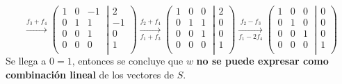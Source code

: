 \documentclass[a4paper,12pt]{article}
\begin{document}
$$
\xrightarrow[]{f_3+f_4}
\left ( \left.\begin{matrix}
1 & 0 & -1 \ \\  
0 & 1 & 1 \ \\ 
0 & 0 & 1 \ \\ 
0 & 0 & 0 \ \\
\end{matrix}\right| \begin{matrix}
2 \\ 
-1\\ 
0 \\
1 \\ 
\end{matrix}\right )
\xrightarrow[f_1+f_3]{f_2+f_4}
\left ( \left.\begin{matrix}
1 & 0 & 0 \ \\  
0 & 1 & 1 \ \\ 
0 & 0 & 1 \ \\ 
0 & 0 & 0 \ \\
\end{matrix}\right| \begin{matrix}
2 \\ 
0 \\ 
0 \\
1 \\ 
\end{matrix}\right )
\xrightarrow[f_1-2f_4]{f_2-f_3}
\left ( \left.\begin{matrix}
1 & 0 & 0 \ \\  
0 & 1 & 0 \ \\ 
0 & 0 & 1 \ \\ 
0 & 0 & 0 \ \\
\end{matrix}\right| \begin{matrix}
0 \\ 
0 \\ 
0 \\
1 \\ 
\end{matrix}\right )
$$
Se llega a $0=1$, entonces se concluye que $w$ \textbf{no se puede expresar como combinación lineal} de los vectores de $S$.
\end{document}
